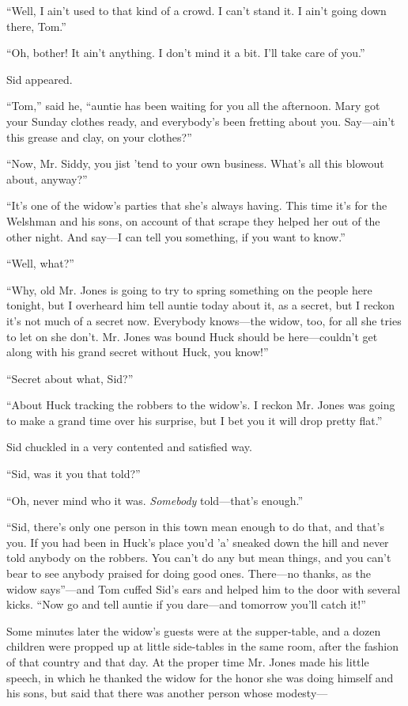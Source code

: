 \documentclass{book}
\begin{document}
“Well, I ain’t used to that kind of a crowd. I can’t stand it. I ain’t going down there, Tom.”

“Oh, bother! It ain’t anything. I don’t mind it a bit. I’ll take care of you.”

Sid appeared.

“Tom,” said he, “auntie has been waiting for you all the afternoon. Mary got your Sunday clothes ready, and everybody’s been fretting about you. Say—ain’t this grease and clay, on your clothes?”

“Now, Mr. Siddy, you jist ’tend to your own business. What’s all this blowout about, anyway?”

“It’s one of the widow’s parties that she’s always having. This time it’s for the Welshman and his sons, on account of that scrape they helped her out of the other night. And say—I can tell you something, if you want to know.”

“Well, what?”

“Why, old Mr. Jones is going to try to spring something on the people here tonight, but I overheard him tell auntie today about it, as a secret, but I reckon it’s not much of a secret now. Everybody knows—the widow, too, for all she tries to let on she don’t. Mr. Jones was bound Huck should be here—couldn’t get along with his grand secret without Huck, you know!”

“Secret about what, Sid?”

“About Huck tracking the robbers to the widow’s. I reckon Mr. Jones was going to make a grand time over his surprise, but I bet you it will drop pretty flat.”

Sid chuckled in a very contented and satisfied way.

“Sid, was it you that told?”

“Oh, never mind who it was. \emph{Somebody} told—that’s enough.”

“Sid, there’s only one person in this town mean enough to do that, and that’s you. If you had been in Huck’s place you’d ’a’ sneaked down the hill and never told anybody on the robbers. You can’t do any but mean things, and you can’t bear to see anybody praised for doing good ones. There—no thanks, as the widow says”—and Tom cuffed Sid’s ears and helped him to the door with several kicks. “Now go and tell auntie if you dare—and tomorrow you’ll catch it!”

Some minutes later the widow’s guests were at the supper-table, and a dozen children were propped up at little side-tables in the same room, after the fashion of that country and that day. At the proper time Mr. Jones made his little speech, in which he thanked the widow for the honor she was doing himself and his sons, but said that there was another person whose modesty—
\end{document}
